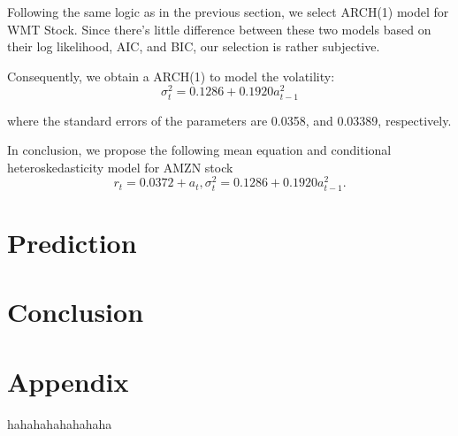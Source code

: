 \documentclass[paper=a4, fontsize=13pt]{article}
\begin{document}
Following the same logic as in the previous section, we select ARCH(1) model for WMT Stock. Since there’s little difference between these two models based on their log likelihood, AIC, and BIC, our selection is rather subjective.

Consequently, we obtain a ARCH(1) to model the volatility:
\[ \sigma_t^2 = 0.1286+0.1920 a_{t-1}^2 \]

where the standard errors of the parameters are 0.0358, and 0.03389, respectively.

In conclusion, we propose the following mean equation and conditional heteroskedasticity model for AMZN stock
\[ r_t = 0.0372+a_t, \sigma_t^2 = 0.1286+0.1920a_{t-1}^2. \]

\section{Prediction}

\section{Conclusion}

\section{Appendix}

\begin{thebibliography}{99}
 hahahahahahahaha
\end{thebibliography}
\end{document}

